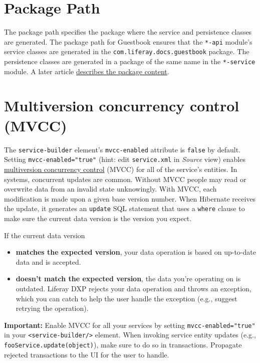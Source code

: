 \noindent\hrulefill

\section{Package Path}\label{package-path}

The package path specifies the package where the service and persistence
classes are generated. The package path for Guestbook ensures that the
\texttt{*-api} module's service classes are generated in the
\texttt{com.liferay.docs.guestbook} package. The persistence classes are
generated in a package of the same name in the \texttt{*-service}
module. A later article
\href{/docs/7-2/appdev/-/knowledge_base/a/running-service-builder}{describes
the package content}.

\section{Multiversion concurrency control
(MVCC)}\label{multiversion-concurrency-control-mvcc}

The \texttt{service-builder} element's \texttt{mvcc-enabled} attribute
is \texttt{false} by default. Setting \texttt{mvcc-enabled="true"}
(hint: edit \texttt{service.xml} in \emph{Source} view) enables
\href{https://en.wikipedia.org/wiki/Multiversion_concurrency_control}{multiversion
concurrency control} (MVCC) for all of the service's entities. In
systems, concurrent updates are common. Without MVCC people may read or
overwrite data from an invalid state unknowingly. With MVCC, each
modification is made upon a given base version number. When Hibernate
receives the update, it generates an \texttt{update} SQL statement that
uses a \texttt{where} clause to make sure the current data version is
the version you expect.

If the current data version

\begin{itemize}
\item
  \textbf{matches the expected version}, your data operation is based on
  up-to-date data and is accepted.
\item
  \textbf{doesn't match the expected version}, the data you're operating
  on is outdated. Liferay DXP rejects your data operation and throws an
  exception, which you can catch to help the user handle the exception
  (e.g., suggest retrying the operation).
\end{itemize}

\textbf{Important:} Enable MVCC for all your services by setting
\texttt{mvcc-enabled="true"} in your
\texttt{\textless{}service-builder/\textgreater{}} element. When
invoking service entity updates (e.g.,
\texttt{fooService.update(object)}), make sure to do so in transactions.
Propagate rejected transactions to the UI for the user to handle.


